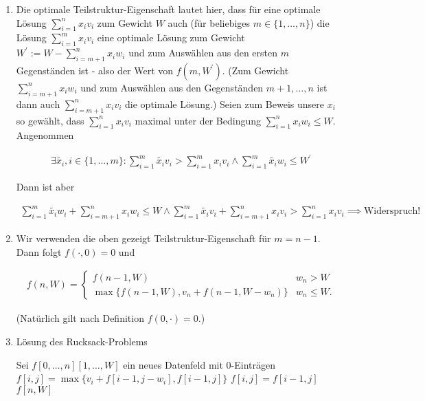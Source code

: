 \begin{solution}

\phantom{}

\begin{enumerate}[label = \alph*)]
  \item Die optimale Teilstruktur-Eigenschaft lautet hier, dass für eine optimale Lösung $\sum_{i=1}^n x_iv_i$ zum Gewicht $W$ auch (für beliebiges $m \in \{1,\dots,n\}$) die Lösung $\sum_{i=1}^m x_iv_i$  eine optimale Lösung zum Gewicht $W^{\prime} := W - \sum_{i=m+1}^n x_iw_i$ und zum Auswählen aus den ersten $m$ Gegenständen ist - also der Wert von $f(m, W^{\prime})$. (Zum Gewicht $\sum_{i=m+1}^n x_iw_i$ und zum Auswählen aus den Gegenständen $m+1, \dots, n$ ist dann auch $\sum_{i=m+1}^n x_iv_i$
  die optimale Lösung.) Seien zum Beweis unsere $x_i$ so gewählt, dass $\sum_{i = 1}^n x_i v_i$ maximal unter der Bedingung $\sum_{i = 1}^n x_i w_i \leq W$. Angenommen

  \begin{align*}
    \exists \tilde{x_i}, i \in \{1,...,m\}: \sum_{i = 1}^m \tilde{x_i} v_i > \sum_{i = 1}^m x_i v_i
    \land
    \sum_{i = 1}^m \tilde{x_i} w_i \leq W^\prime
  \end{align*}

  Dann ist aber

  \begin{align*}
    \sum_{i = 1}^m \tilde{x_i} w_i + \sum_{i = m+1}^n x_i w_i \leq W
    \land
    \sum_{i = 1}^m \tilde{x_i} v_i + \sum_{i = m+1}^n x_i v_i > \sum_{i = 1}^n x_i v_i
    \implies \text{Widerspruch!}
  \end{align*}

  \item Wir verwenden die oben gezeigt Teilstruktur-Eigenschaft für $m = n-1$.
  Dann folgt $f(\cdot,0) = 0$ und

  \begin{align*}
    f(n,W) = \begin{cases}
      f(n-1,W) & w_n > W \\
      \max\{f(n-1,W), v_n + f(n-1, W-w_n)\} & w_n \leq W.
    \end{cases}
  \end{align*}

  (Natürlich gilt nach Definition $f(0,\cdot) = 0$.)

  \item
  \begin{algorithm}
      \caption{Lösung des Rucksack-Problems}
      \begin{algorithmic}[1]
              \State Sei $f[0,\dots,n][1,\dots,W]$ ein neues Datenfeld mit $0$-Einträgen
                          \State $f[i,j] = \max\{v_i + f[i-1,j-w_i], f[i-1,j]\}$
                      \Else
                          \State $f[i,j] = f[i-1,j]$
                      \EndIf
                  \EndFor
              \EndFor
              \State \Return $f[n,W]$
          \EndProcedure
      \end{algorithmic}
  \end{algorithm}
\end{enumerate}

\end{solution}
